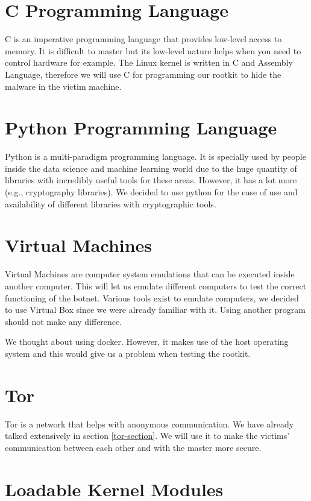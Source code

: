 \documentclass[11pt, a4paper,twoside]{tesi_upf}
\begin{document}
\section{C Programming Language}

C is an imperative programming language that provides low-level access to memory. It is difficult to master but its low-level nature helps when you need to control hardware for example. The Linux kernel is written in C and Assembly Language, therefore we will use C for programming our rootkit to hide the malware in the victim machine.

\section{Python Programming Language}

Python is a multi-paradigm programming language. It is specially used by people inside the data science and machine learning world due to the huge quantity of libraries with incredibly useful tools for these areas. However, it has a lot more (e.g., cryptography libraries). We decided to use python for the ease of use and availability of different libraries with cryptographic tools.

\section{Virtual Machines}

Virtual Machines are computer system emulations that can be executed inside another computer. This will let us emulate different computers to test the correct functioning of the botnet. Various tools exist to emulate computers, we decided to use Virtual Box since we were already familiar with it. Using another program should not make any difference.

We thought about using docker. However, it makes use of the host operating system and this would give us a problem when testing the rootkit.

\section{Tor}

Tor is a network that helps with anonymous communication. We have already talked extensively in section \ref{tor-section}. We will use it to make the victims' communication between each other and with the master more secure.

\section{Loadable Kernel Modules}
\end{document}
